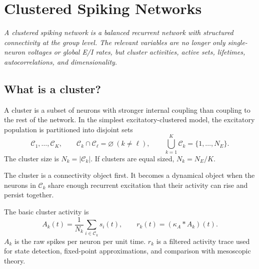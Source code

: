 \chapter{Clustered Spiking Networks}
\label{ch:clustered-spiking-networks}

\textit{A clustered spiking network is a balanced recurrent network with structured connectivity at the group level. The relevant variables are no longer only single-neuron voltages or global E/I rates, but cluster activities, active sets, lifetimes, autocorrelations, and dimensionality.}


\section{What is a cluster?}
\label{sec:what-is-a-cluster}

A cluster is a subset of neurons with stronger internal coupling than coupling to the rest of the network. In the simplest excitatory-clustered model, the excitatory population is partitioned into disjoint sets
%
\begin{equation}
  \mathcal{C}_1,\ldots,\mathcal{C}_K,
  \qquad
  \mathcal{C}_k\cap\mathcal{C}_{\ell}=\varnothing\ (k\neq \ell),
  \qquad
  \bigcup_{k=1}^{K}\mathcal{C}_k=\{1,\ldots,N_E\}.
  \label{eq:cluster-partition-ch05}
\end{equation}
%
The cluster size is $N_k=|\mathcal{C}_k|$. If clusters are equal sized, $N_k=N_E/K$.

The cluster is a connectivity object first. It becomes a dynamical object when the neurons in $\mathcal{C}_k$ share enough recurrent excitation that their activity can rise and persist together.

The basic cluster activity is
%
\begin{equation}
  A_k(t)
  =
  \frac{1}{N_k}\sum_{i\in\mathcal{C}_k}s_i(t),
  \qquad
  r_k(t)
  =
  (\kappa_A*A_k)(t).
  \label{eq:cluster-activity-rate-ch05}
\end{equation}
%
$A_k$ is the raw spikes per neuron per unit time. $r_k$ is a filtered activity trace used for state detection, fixed-point approximations, and comparison with mesoscopic theory.

